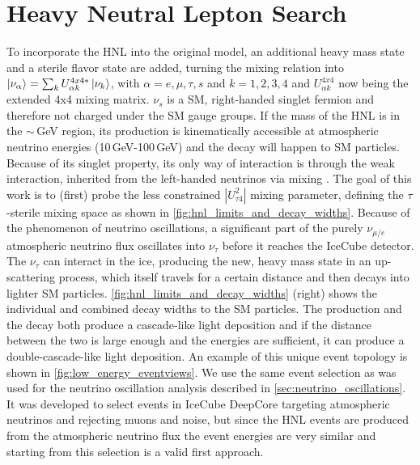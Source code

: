 \documentclass[a4paper,11pt]{article}
\begin{document}
\vspace{-0.5cm}
\section{Heavy Neutral Lepton Search}

To incorporate the HNL into the original model, an additional heavy mass state and a sterile flavor state are added, turning the mixing relation into $\ket{\nu_\alpha} = \sum_kU^{4x4*}_{\alpha k}\ket{\nu_k}$, with $\alpha=e,\mu,\tau,s$ and $k=1,2,3,4$ and $U^{4x4}_{\alpha k}$ now being the extended 4x4 mixing matrix. $\nu_s$ is a SM, right-handed singlet fermion and therefore not charged under the SM gauge groups. If the mass of the HNL is in the $\sim$\,GeV region, its production is kinematically accessible at atmospheric neutrino energies (10\,GeV-100\,GeV) and the decay will happen to SM particles. Because of its singlet property, its only way of interaction is through the weak interaction, inherited from the left-handed neutrinos via mixing \cite{Coloma:2020lgy}. The goal of this work is to (first) probe the less constrained $|U_{\tau4}^2|$ mixing parameter, defining the $\tau$-sterile mixing space as shown in \cref{fig:hnl_limits_and_decay_widths}. Because of the phenomenon of neutrino oscillations, a significant part of the purely $\nu_{\mu/e}$ atmospheric neutrino flux oscillates into $\nu_\tau$ before it reaches the IceCube detector. The $\nu_\tau$ can interact in the ice, producing the new, heavy mass state in an up-scattering process, which itself travels for a certain distance and then decays into lighter SM particles. \cref{fig:hnl_limits_and_decay_widths} (right) shows the individual and combined decay widths to the SM particles. The production and the decay both produce a cascade-like light deposition and if the distance between the two is large enough and the energies are sufficient, it can produce a double-cascade-like light deposition. An example of this unique event topology is shown in \cref{fig:low_energy_eventviews}. We use the same event selection as was used for the neutrino oscillation analysis described in \cref{sec:neutrino_oscillations}. It was developed to select events in IceCube DeepCore targeting atmospheric neutrinos and rejecting muons and noise, but since the HNL events are produced from the atmospheric neutrino flux the event energies are very similar and starting from this selection is a valid first approach.
\end{document}
